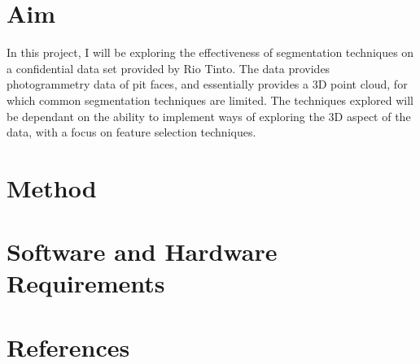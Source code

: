 \documentclass[12pt, a4paper]{article}
\begin{document}
\section*{Aim}
In this project, I will be exploring the effectiveness of segmentation techniques on a confidential data set provided by Rio Tinto. The data provides photogrammetry data of pit faces, and essentially provides a 3D point cloud, for which common segmentation techniques are limited. The techniques explored will be dependant on the ability to implement ways of exploring the 3D aspect of the data, with a focus on feature selection techniques.
\section*{Method}
\section*{Software and Hardware Requirements}
\section*{References}


\end{document}
